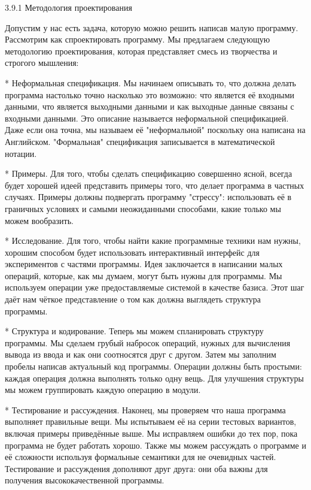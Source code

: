 3.9.1 Методология проектирования

Допустим у нас есть задача, которую можно решить написав малую программу. Рассмотрим как спроектировать программу. Мы предлагаем следующую методологию проектирования, которая представляет смесь из творчества и строгого мышления:

* Неформальная спецификация. Мы начинаем описывать то, что должна делать программа настолько точно насколько это возможно: что является её входными данными, что является выходными данными и как выходные данные связаны с входными данными. Это описание называется неформальной спецификацией. Даже если она точна, мы называем её "неформальной" поскольку она написана на Английском. "Формальная" спецификация записывается в математической нотации.

* Примеры. Для того, чтобы сделать спецификацию совершенно ясной, всегда будет хорошей идеей представить примеры того, что делает программа в частных случаях. Примеры должны подвергать программу "стрессу": использовать её в граничных условиях и самыми неожиданными способами, какие только мы можем вообразить.

* Исследование. Для того, чтобы найти какие программные техники нам нужны, хорошим способом будет использовать интерактивный интерфейс для экспериментов с частями программы. Идея заключается в написании малых операций, которые, как мы думаем, могут быть нужны для программы. Мы используем операции уже предоставляемые системой в качестве базиса. Этот шаг даёт нам чёткое представление о том как должна выглядеть структура программы.

* Структура и кодирование. Теперь мы можем спланировать структуру программы. Мы сделаем грубый набросок операций, нужных для вычисления вывода из ввода и как они соотносятся друг с другом. Затем мы заполним пробелы написав актуальный код программы. Операции должны быть простыми: каждая операция должна выполнять только одну вещь. Для улучшения структуры мы можем группировать каждую операцию в модули.

* Тестирование и рассуждения. Наконец, мы проверяем что наша программа выполняет правильные вещи. Мы испытываем её на серии тестовых вариантов, включая примеры приведённые выше. Мы исправляем ошибки до тех пор, пока программа не будет работать хорошо. Также мы можем рассуждать о программе и её сложности используя формальные семантики для не очевидных частей. Тестирование и рассуждения дополняют друг друга: они оба важны для получения высококачественной программы.

